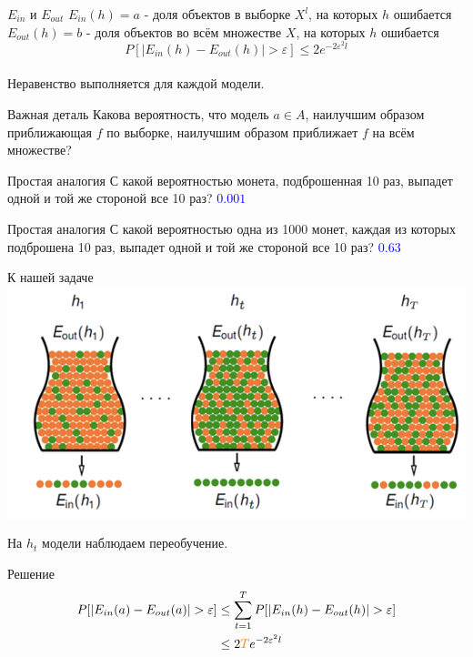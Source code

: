 \documentclass[10pt]{beamer}
\begin{document}
\begin{frame}{$E_{in}$ и $E_{out}$}
  $E_{in}(h) = a$ - доля объектов в выборке $X^l$, на которых $h$ ошибается\\
  $E_{out}(h) = b$ - доля объектов во всём множестве $X$, на которых $h$ ошибается\\
  \bigbreak
  $$P[\vert E_{in}(h) - E_{out}(h) \vert > \varepsilon ] \leq 2 e^{-2 \varepsilon^2 l} $$\\
  \bigbreak
  Неравенство выполняется для каждой модели.
\end{frame}

\begin{frame}{Важная деталь}
  \centering
  Какова вероятность, что модель $a \in A$, наилучшим образом приближающая $f$ по выборке, наилучшим образом приближает $f$ на всём множестве?
\end{frame}

\begin{frame}{Простая аналогия}
  \centering
  С какой вероятностью монета, подброшенная 10 раз, выпадет одной и той же стороной все 10 раз?
  \pause
  \bigbreak
  \textcolor{blue}{$0.001$}
\end{frame}

\begin{frame}{Простая аналогия}
  \centering
  С какой вероятностью одна из 1000 монет, каждая из которых подброшена 10 раз, выпадет одной и той же стороной все 10 раз?
  \pause
  \bigbreak
  \textcolor{blue}{$0.63$}
\end{frame}

\begin{frame} {К нашей задаче}
  \includegraphics[width=\textwidth, keepaspectratio]{images/bins}
  
  На $h_t$ модели наблюдаем переобучение.
\end{frame}

\begin{frame} {Решение}
  \begin{align*}
    P[\vert E_{in}(a) - E_{out}(a) \vert > \varepsilon ] &\leq \sum\limits_{t=1}^T P[\vert E_{in}(h) - E_{out}(h) \vert > \varepsilon ] \\
    & \leq 2\textcolor{orange}{T} e^{-2 \varepsilon^2 l} 
  \end{align*}
\end{frame}
\end{document}
